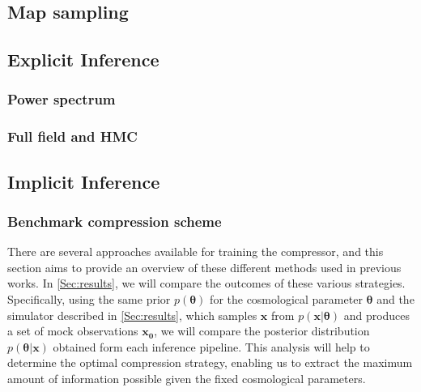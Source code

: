 \documentclass{aa}
\begin{document}
\subsection{Map sampling}


\subsection{Explicit Inference}
\subsubsection{Power spectrum}
\subsubsection{Full field and HMC}
\subsection{Implicit Inference}

\subsubsection{Benchmark compression scheme}
There are several approaches available for training the compressor, and this section aims to provide an overview of these different methods used in previous works. 
In \autoref{Sec:results}, we will compare the outcomes of these various strategies. Specifically, using the same prior $p(\bm {\theta})$ for the cosmological parameter $\bm{\theta}$ and the simulator described in \autoref{Sec:results}, which samples $\bm {x}$ from $p(\bm{x}| \bm{\theta})$ and produces a set of mock observations $\bm{x_0}$, we will compare the posterior distribution $p(\bm{\theta}|\bm{x})$ obtained form each inference pipeline. This analysis will help to determine the optimal compression strategy, enabling us to extract the maximum amount of information possible given the fixed cosmological parameters.
\end{document}
